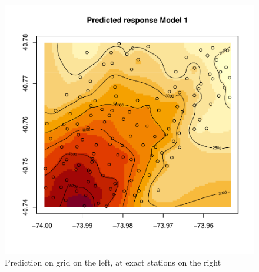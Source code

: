 \documentclass[12pt]{article}
\begin{document}
\begin{figure}[H]
	\includegraphics[scale=0.50]{Plots_North+South/v1_both_pred_stations.pdf}
	\caption{Prediction on grid on the left, at exact stations on the right}\label{pred2}
\end{figure}
\end{document}
